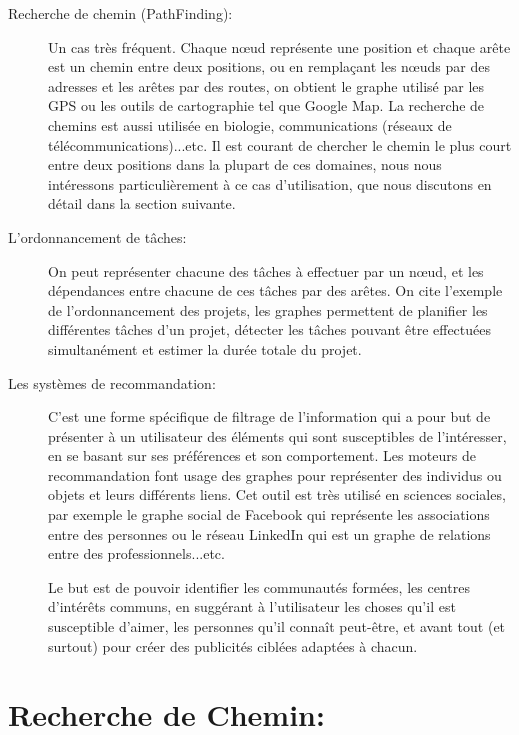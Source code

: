 \begin{description}


\item[Recherche de chemin (PathFinding):]
Un cas très fréquent. Chaque nœud représente une position et chaque arête est un chemin entre deux positions, ou en remplaçant les nœuds par des adresses et les arêtes par des routes, on obtient le graphe utilisé par les GPS ou les outils de cartographie tel que Google Map.
La recherche de chemins est aussi utilisée en biologie, communications (réseaux de télécommunications)...etc.
Il est courant de chercher le chemin le plus court entre deux positions dans la plupart de ces domaines, nous nous intéressons particulièrement à ce cas d'utilisation, que nous discutons en détail dans la section suivante.


\item[L'ordonnancement de tâches:]
On peut représenter chacune des tâches à effectuer par un nœud, et les dépendances entre chacune de ces tâches par des arêtes.
On cite l'exemple de l'ordonnancement des projets, les graphes permettent de planifier les différentes tâches d'un projet, détecter les tâches pouvant être effectuées simultanément et estimer la durée totale du projet.

\item[Les systèmes de recommandation:]
C'est une forme spécifique de filtrage de l'information qui a pour but de présenter à un utilisateur des éléments qui sont susceptibles de l'intéresser, en se basant sur ses préférences et son comportement.
Les moteurs de recommandation font usage des graphes pour représenter des individus ou objets et leurs différents liens. Cet outil est très utilisé en sciences sociales, par exemple le graphe social de Facebook qui représente les associations entre des personnes ou le réseau LinkedIn qui est un graphe de relations entre des professionnels...etc.

Le but est de pouvoir identifier les communautés formées, les centres d'intérêts communs, en suggérant à l'utilisateur les choses qu'il est susceptible d'aimer, les personnes qu'il connaît peut-être, et avant tout (et surtout) pour créer des publicités ciblées adaptées à chacun.

\end{description}

\section{Recherche de Chemin:}

